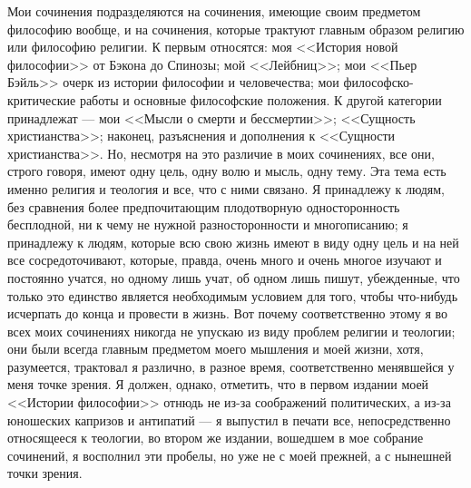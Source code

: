 \documentclass[12pt]{article}
\begin{document}
Мои сочинения подразделяются на сочинения, имеющие своим предметом философию вообще, и на сочинения, которые трактуют главным образом религию или философию религии. К первым относятся: моя <<История новой философии>> от Бэкона до Спинозы; мой <<Лейбниц>>; мои <<Пьер Бэйль>>  очерк из истории философии и человечества; мои философско-критические работы и основные философские положения. К другой категории принадлежат --- мои <<Мысли о смерти и бессмертии>>; <<Сущность христианства>>; наконец, разъяснения и дополнения к <<Сущности христианства>>. Но, несмотря на это различие в моих сочинениях, все они, строго говоря, имеют одну цель, одну волю и мысль, одну тему. Эта тема есть именно религия и теология и все, что с ними связано. Я принадлежу к людям, без сравнения более предпочитающим плодотворную односторонность бесплодной, ни к чему не нужной разносторонности и многописанию; я принадлежу к людям, которые всю свою жизнь имеют в виду одну цель и на ней все сосредоточивают, которые, правда, очень много и очень многое изучают и постоянно учатся, но одному лишь учат, об одном лишь пишут, убежденные, что только это единство является необходимым условием для того, чтобы что-нибудь исчерпать до конца и провести в жизнь. Вот почему соответственно этому я во всех моих сочинениях никогда не упускаю из виду проблем религии и теологии; они были всегда главным предметом моего мышления и моей жизни, хотя, разумеется, трактовал я различно, в разное время, соответственно менявшейся у меня точке зрения. Я должен, однако, отметить, что в первом издании моей <<Истории философии>> отнюдь не из-за соображений политических, а из-за юношеских капризов и антипатий --- я выпустил в печати все, непосредственно относящееся к теологии, во втором же издании, вошедшем в мое собрание сочинений, я восполнил эти пробелы, но уже не с моей прежней, а с нынешней точки зрения. 
\end{document}
